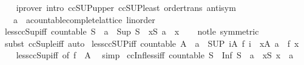 \begin{isabellebody}
%
\isadelimproof
\ \ %
\endisadelimproof
%
\isatagproof
{}\isamarkupfalse%
\ {\isacharparenleft}iprover\ intro{\isacharcolon}\ ccSUP{\isacharunderscore}upper\ ccSUP{\isacharunderscore}least\ order{\isacharunderscore}trans\ antisym{\isacharparenright}%
\endisatagproof
{\isafoldproof}%
%
\isadelimproof
\isanewline
%
\endisadelimproof
\isanewline
{}\isamarkupfalse%
\isanewline
\isanewline
{}\isamarkupfalse%
\isanewline
\ \ \ a\ {\isacharcolon}{\isacharcolon}\ {\isachardoublequoteopen}{\isacharprime}a{\isacharcolon}{\isacharcolon}{\isacharbraceleft}countable{\isacharunderscore}complete{\isacharunderscore}lattice{\isacharcomma}\ linorder{\isacharbraceright}{\isachardoublequoteclose}\isanewline
{}\isanewline
\isanewline
{}\isamarkupfalse%
\ less{\isacharunderscore}ccSup{\isacharunderscore}iff{\isacharcolon}\ {\isachardoublequoteopen}countable\ S\ {\isasymLongrightarrow}\ a\ {\isacharless}\ Sup\ S\ {\isasymlongleftrightarrow}\ {\isacharparenleft}{\isasymexists}x{\isasymin}S{\isachardot}\ a\ {\isacharless}\ x{\isacharparenright}{\isachardoublequoteclose}\isanewline
%
\isadelimproof
\ \ %
\endisadelimproof
%
\isatagproof
{}\isamarkupfalse%
\ not{\isacharunderscore}le\ {\isacharbrackleft}symmetric{\isacharbrackright}\ \isamarkupfalse%
\ {\isacharparenleft}subst\ ccSup{\isacharunderscore}le{\isacharunderscore}iff{\isacharparenright}\ auto%
\endisatagproof
{\isafoldproof}%
%
\isadelimproof
\isanewline
%
\endisadelimproof
\isanewline
{}\isamarkupfalse%
\ less{\isacharunderscore}ccSUP{\isacharunderscore}iff{\isacharcolon}\ {\isachardoublequoteopen}countable\ A\ {\isasymLongrightarrow}\ a\ {\isacharless}\ {\isacharparenleft}SUP\ i{\isasymin}A{\isachardot}\ f\ i{\isacharparenright}\ {\isasymlongleftrightarrow}\ {\isacharparenleft}{\isasymexists}x{\isasymin}A{\isachardot}\ a\ {\isacharless}\ f\ x{\isacharparenright}{\isachardoublequoteclose}\isanewline
%
\isadelimproof
\ \ %
\endisadelimproof
%
\isatagproof
{}\isamarkupfalse%
\ less{\isacharunderscore}ccSup{\isacharunderscore}iff\ {\isacharbrackleft}of\ {\isachardoublequoteopen}f\ {\isacharbackquote}\ A{\isachardoublequoteclose}{\isacharbrackright}\ \isamarkupfalse%
\ simp%
\endisatagproof
{\isafoldproof}%
%
\isadelimproof
\isanewline
%
\endisadelimproof
\isanewline
{}\isamarkupfalse%
\ ccInf{\isacharunderscore}less{\isacharunderscore}iff{\isacharcolon}\ {\isachardoublequoteopen}countable\ S\ {\isasymLongrightarrow}\ Inf\ S\ {\isacharless}\ a\ {\isasymlongleftrightarrow}\ {\isacharparenleft}{\isasymexists}x{\isasymin}S{\isachardot}\ x\ {\isacharless}\ a{\isacharparenright}{\isachardoublequoteclose}\isanewline

\end{isabellebody}
